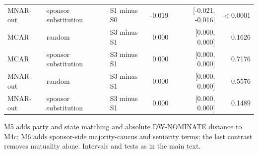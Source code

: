 \begin{table}[tbp]
\begin{tabular}{lllrrr}
MNAR-out & sponsor substitution & S1 minus S0 & -0.019 & [-0.021, -0.016] & $<0.0001$ \\
MCAR & random & S3 minus S1 & 0.000 & [0.000, 0.000] & 0.1626 \\
MCAR & sponsor substitution & S3 minus S1 & 0.000 & [0.000, 0.000] & 0.7176 \\
MNAR-out & random & S3 minus S1 & 0.000 & [0.000, 0.000] & 0.5576 \\
MNAR-out & sponsor substitution & S3 minus S1 & 0.000 & [0.000, 0.000] & 0.1489 \\
\bottomrule
\end{tabular}
\par\vspace{2pt}\footnotesize M5 adds party and state matching and absolute DW-NOMINATE distance to M4c; M6 adds sponsor-side majority-caucus and seniority terms; the last contrast removes mutuality alone. Intervals and tests as in the main text.
\end{table}